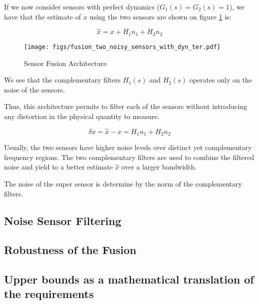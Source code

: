 \documentclass[9pt, technote, a4paper]{ieeeconf}
\begin{document}
If we now consider sensors with perfect dynamics (\(G_1(s) = G_2(s) = 1\)), we have that the estimate of \(x\) using the two sensors are shown on figure \ref{fig:fusion_two_noisy_sensors_with_dyn_ter} is:

\begin{equation}
  \hat{x} = x + H_1 n_1 + H_2 n_2
\end{equation}

\begin{figure}[htbp]
\centering
\texttt{[image: figs/fusion\_two\_noisy\_sensors\_with\_dyn\_ter.pdf]}
\caption{\label{fig:fusion_two_noisy_sensors_with_dyn_ter}
Sensor Fusion Architecture}
\end{figure}

We see that the complementary filters \(H_1(s)\) and \(H_2(s)\) operates only on the noise of the sensors.

Thus, this architecture permits to filter each of the sensors without introducing any distortion in the physical quantity to measure.

\begin{equation}
  \delta x = \hat{x} - x = H_1 n_1 + H_2 n_2
\end{equation}

Usually, the two sensors have higher noise levels over distinct yet complementary frequency regions. The two complementary filters are used to combine the filtered noise and yield to a better estimate \(\hat{x}\) over a larger bandwidth.

The noise of the super sensor is determine by the norm of the complementary filters.

\subsection{Noise Sensor Filtering}
\label{sec:orga5d7d56}
\label{sec:noise_filtering}

\subsection{Robustness of the Fusion}
\label{sec:org4ea42db}
\label{sec:fusion_robustness}

\subsection{Upper bounds as a mathematical translation of the requirements}
\label{sec:orgfad4c6f}
\label{sec:requirements_upper_bounds}
\end{document}
